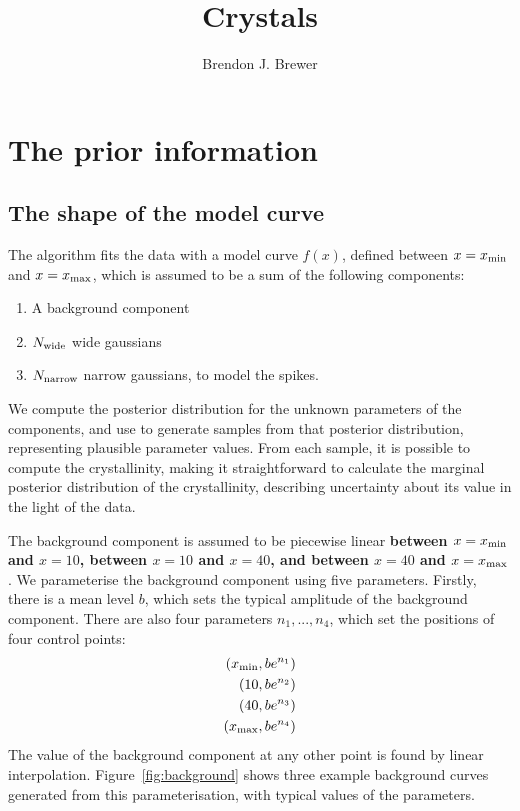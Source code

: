 \documentclass[a4paper, 12pt]{article}
\title{Crystals}
\author{Brendon J. Brewer}
\date{}
\newcommand{\x}{x}
\newcommand{\todo}{\color{orange} \bf}
\begin{document}
\maketitle


\setlength{\parindent}{0pt}
\setlength{\parskip}{8pt}

\section{The prior information}



\subsection{The shape of the model curve}
The algorithm fits the data with a model curve
$f(\x)$, defined between $\x=\x_{\rm min}$ and $\x=\x_{\rm max}$,
which is assumed to be a sum of the following components:
\begin{enumerate}
\item A background component
\item $N_{\rm wide}$ wide gaussians
\item $N_{\rm narrow}$ narrow gaussians, to model the spikes.
\end{enumerate}

We compute the posterior distribution for the unknown parameters of the
components, and use \citep{dnest4} to generate samples from that posterior
distribution, representing plausible parameter values. From each sample,
it is possible to compute the crystallinity, making it straightforward to
calculate the marginal posterior distribution of the crystallinity, describing
uncertainty about its value in the light of the data.


The background component is assumed to be piecewise linear
{\todo between $\x=\x_{\rm min}$ and $\x=10$, between $\x=10$ and $\x=40$,
and between $\x=40$ and $\x=\x_{\rm max}$}.
We parameterise the background component using
five parameters. Firstly, there is a mean level $b$, which sets the
typical amplitude of the background component. There are also four parameters
$n_1, ..., n_4$, which set the positions of four control points:
\begin{align}
\left(\x_{\rm min}, be^{n_1}\right) \nonumber\\
\left(10, be^{n_2}\right) \nonumber\\
\left(40, be^{n_3}\right) \nonumber\\
\left(\x_{\rm max}, be^{n_4}\right) \nonumber
\end{align}
The value of the background component at any other point is found by
linear interpolation. Figure~\ref{fig:background} shows three example
background curves generated from this parameterisation, with typical
values of the parameters.
\end{document}
